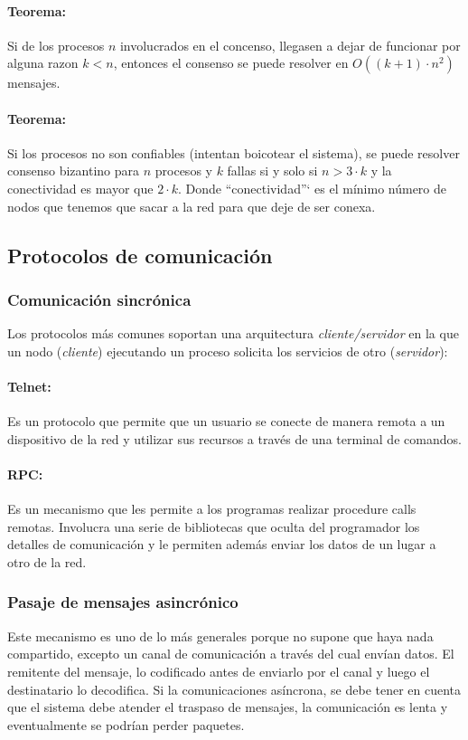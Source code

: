 \paragraph{Teorema:} Si de los procesos $n$ involucrados en el concenso, llegasen a dejar de funcionar por alguna razon $k < n$, entonces el consenso se puede resolver en $O((k+1)\cdot n^2)$ mensajes.

\paragraph{Teorema:} Si los procesos no son confiables (intentan boicotear el sistema), se puede resolver consenso bizantino para $n$ procesos y $k$ fallas si y solo si $n > 3\cdot k$ y la conectividad es mayor que $2\cdot k$. Donde ``conectividad''` es el mínimo número de nodos que tenemos que sacar a la red para que deje de ser conexa.


\subsection{Protocolos de comunicación}
\subsubsection{Comunicación sincrónica}
Los protocolos más comunes soportan una arquitectura \textit{cliente/servidor} en la que un nodo (\textit{cliente}) ejecutando un proceso solicita los servicios de otro (\textit{servidor}):
\paragraph{Telnet:} Es un protocolo que permite que un usuario se conecte de manera remota a un dispositivo de la red y utilizar sus recursos a través de una terminal de comandos.
\paragraph{RPC:} Es un mecanismo que les permite a los programas realizar procedure calls remotas. Involucra una serie de bibliotecas que oculta del programador los detalles de comunicación y le permiten además enviar los datos de un lugar a otro de la red.

\subsubsection{Pasaje de mensajes asincrónico}
Este mecanismo es uno de lo más generales porque no supone que haya nada compartido, excepto un canal de comunicación a través del cual envían datos. El remitente del mensaje, lo codificado antes de enviarlo por el canal y luego el destinatario lo decodifica. Si la comunicaciones asíncrona, se debe tener en cuenta que el sistema debe atender el traspaso de mensajes, la comunicación es lenta y eventualmente se podrían perder paquetes.

